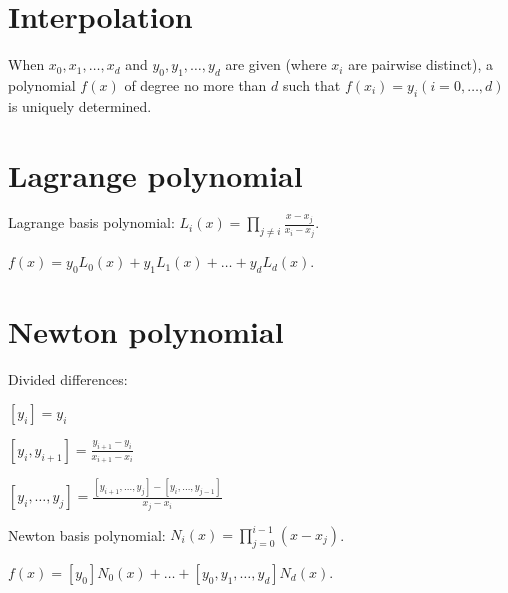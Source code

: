 \section*{Interpolation}

When $x_0, x_1, \dots, x_d$ and $y_0, y_1, \dots, y_d$
are given (where $x_i$ are pairwise distinct), a polynomial
$f(x)$ of degree no more than $d$ such that $f(x_i) = y_i (i = 0, \dots, d)$
is uniquely determined.

\section*{Lagrange polynomial}

Lagrange basis polynomial: $L_i(x) = \prod_{j \ne i} \frac{x - x_j}{x_i - x_j}$.
	
$f(x) = y_0 L_0(x) + y_1 L_1(x) + \dots + y_d L_d(x)$.

\section*{Newton polynomial}

Divided differences:

$[y_i] = y_i$

$[y_i, y_{i + 1}] = \frac{y_{i + 1} - y_i}{x_{i + 1} - x_i}$

$[y_i, \dots, y_j] = \frac{[y_{i + 1}, \dots, y_j] - [y_i, \dots, y_{j - 1}]}{x_j - x_i}$

Newton basis polynomial: $N_i(x) = \prod_{j=0}^{i-1} (x - x_j)$.

$f(x) = [y_0] N_0(x) + \dots + [y_0, y_1, \dots, y_d] N_d(x)$.
